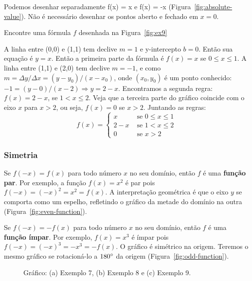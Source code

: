 \noindent Podemos desenhar separadamente f(x) = x e f(x) = -x (Figura~\ref{fig:absolute-value}). Não é necessário desenhar os pontos aberto e fechado em $x=0$.

 Encontre uma fórmula $f$ desenhada na Figura~\ref{fig:ex9}

\solution A linha entre (0,0) e (1,1) tem declive $m = 1$ e y-intercepto $b=0$. Então sua equação é $y=x$. Então a primeira parte da fórmula é $f(x) = x$ se $0\leq x \leq 1$. A linha entre (1,1) e (2,0) tem declive $m=-1$, e como $m=\Delta y/\Delta x=(y-y_0)/(x-x_0)$, onde $(x_0,y_0)$ é um ponto conhecido: $-1 = (y-0)/(x-2) \Rightarrow y=2-x$. Encontramos a segunda regra: $f(x) = 2-x$, se $1<x\leq 2$. Veja que a terceira parte do gráfico coincide com o eixo $x$ para $x>2$, ou seja, $f(x)=0$ se $x>2$. Juntando as regras: $$f(x)=\begin{cases}
x & \text{ se } 0 \leq x \leq 1\\
2-x & \text{ se } 1 < x \leq 2\\
0 & \text{ se } x > 2
\end{cases}$$
\vspace{-0.5cm}

\subsubsection{Simetria}
Se $f(-x)=f(x)$ para todo número $x$ no seu domínio, então $f$ é uma \textbf{função par}. Por exemplo, a função $f(x)=x^2$ é par pois $f(-x)=(-x)^2 = x^2 = f(x)$. A interpretação geométrica é que o eixo $y$ se comporta como um espelho, refletindo o gráfico da metade do domínio na outra (Figura~\ref{fig:even-function}).

Se $f(-x)=-f(x)$ para todo número $x$ no seu domínio, então $f$ é uma \textbf{função ímpar}. Por exemplo, $f(x) = x^3$ é ímpar pois $f(-x) = (-x)^3 = -x^3 = -f(x)$. O gráfico é simétrico na origem. Teremos o mesmo gráfico se rotacioná-lo a $180\degree$ da origem (Figura~\ref{fig:odd-function}).
\begin{figure}[!ht]
  \centering
  \caption{Gráfico: (a) Exemplo 7, (b) Exemplo 8 e (c) Exemplo 9.}
  \vspace{-0.5cm}
\end{figure}

